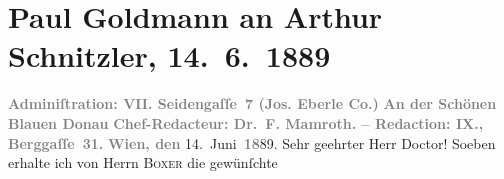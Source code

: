 

         
         \renewcommand{\erwaehntePersonen}{Personen: Oswald Boxer, Paul Lindau, Fedor Mamroth}
         \renewcommand{\erwaehnteInstitutionen}{Institutionen: An der schönen blauen Donau, Die Presse, Josef Eberle  Stein-, Buch und Musikaliendruckerei, Nord und Süd}
         \renewcommand{\erwaehnteOrte}{Orte: Berggasse, Berlin, Seidengasse, Wien}
         \renewcommand{\erwaehnteWerke}{Werke: [Die Wärterin]}
               \section[Paul Goldmann an Arthur Schnitzler, 14. 6. 1889]{ Paul Goldmann an Arthur Schnitzler, 14. 6. 1889}\nopagebreak{}\rehead{ }\begin{ledgroupsized}[t]{13cm}\normalsize\beginnumbering \toendnotes[C]{\smallbreak\pagebreak[2]} 
\toendnotes[C]{\smallbreak}\pstart
           \noindent{}\centering{}{\pb}\textcolor{gray}{\textbf{\textbf{Adminiſtration: VII.
                           Seidengaſſe 7} (Jos. Eberle {\kaufmannsund} Co.)}}\pend
           \pstart
           \noindent{}\centering{}\textcolor{gray}{\textbf{An der Schönen Blauen Donau}}\pend
           \pstart
           \noindent{}\centering{}\textcolor{gray}{\textbf{Chef-Redacteur: Dr. F.
                        Mamroth. – Redaction: IX.,
                        Berggaſſe 31.}}\pend
           \pstart
           \raggedleft{}\textcolor{gray}{\textbf{Wien, den}}{ }14. Juni \textcolor{gray}{\textbf{18}}89.\pend
           \pstart\center{}Sehr geehrter Herr Doctor!\pend\pstart
           Soeben erhalte ich von Herrn \textsc{Boxer} die gewünſchte \label{K_L02639-1v}
\end{ledgroupsized}

